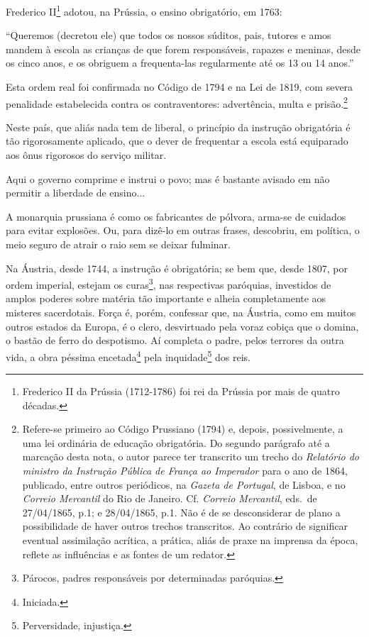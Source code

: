 Frederico II\footnote{Frederico II da Prússia (1712-1786) foi rei da
  Prússia por mais de quatro décadas.} adotou, na Prússia, o ensino
obrigatório, em 1763:

``Queremos (decretou ele) que todos os nossos súditos, pais, tutores e
amos mandem à escola as crianças de que forem responsáveis, rapazes e
meninas, desde os cinco anos, e os obriguem a frequenta-las regularmente
até os 13 ou 14 anos.''

Esta ordem real foi confirmada no Código de 1794 e na Lei de 1819, com
severa penalidade estabelecida contra os contraventores: advertência,
multa e prisão.\footnote{Refere-se primeiro ao Código Prussiano (1794)
  e, depois, possivelmente, a uma lei ordinária de educação obrigatória.
  Do segundo parágrafo até a marcação desta nota, o autor parece ter
  transcrito um trecho do \emph{Relatório do ministro da Instrução
  Pública de França ao Imperador} para o ano de 1864, publicado, entre
  outros periódicos, na \emph{Gazeta de Portugal}, de Lisboa, e no
  \emph{Correio Mercantil} do Rio de Janeiro. Cf. \emph{Correio
  Mercantil}, eds.~de 27/04/1865, p.1; e 28/04/1865, p.1. Não é de se
  desconsiderar de plano a possibilidade de haver outros trechos
  transcritos. Ao contrário de significar eventual assimilação acrítica,
  a prática, aliás de praxe na imprensa da época, reflete as influências
  e as fontes de um redator.}

Neste país, que aliás nada tem de liberal, o princípio da instrução
obrigatória é tão rigorosamente aplicado, que o dever de frequentar a
escola está equiparado aos ônus rigorosos do serviço militar.

Aqui o governo comprime e instrui o povo; mas é bastante avisado em não
permitir a liberdade de ensino...

A monarquia prussiana é como os fabricantes de pólvora, arma-se de
cuidados para evitar explosões. Ou, para dizê-lo em outras frases,
descobriu, em política, o meio seguro de atrair o raio sem se deixar
fulminar.

Na Áustria, desde 1744, a instrução é obrigatória; se bem que, desde
1807, por ordem imperial, estejam os curas\footnote{Párocos, padres
  responsáveis por determinadas paróquias.}, nas respectivas paróquias,
investidos de amplos poderes sobre matéria tão importante e alheia
completamente aos misteres sacerdotais. Força é, porém, confessar que,
na Áustria, como em muitos outros estados da Europa, é o clero,
desvirtuado pela voraz cobiça que o domina, o bastão de ferro do
despotismo. Aí completa o padre, pelos terrores da outra vida, a obra
péssima encetada\footnote{Iniciada.} pela inquidade\footnote{
  Perversidade, injustiça.} dos reis.

